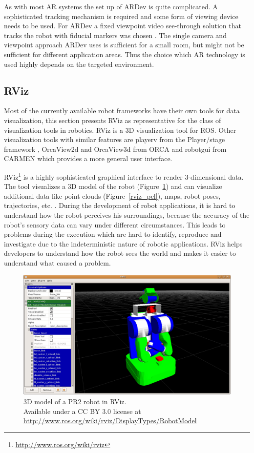 As with most AR systems the set up of ARDev is quite complicated. A sophisticated tracking mechanism is required and some form of viewing device needs to be used. For ARDev a fixed viewpoint video see-through solution that tracks the robot with fiducial markers was chosen \cite{Collett2010}. The single camera and viewpoint approach ARDev uses is sufficient for a small room, but might not be sufficient for different application areas. Thus the choice which AR technology is used highly depends on the targeted environment.

\subsection{RViz}
\label{rviz}
Most of the currently available robot frameworks have their own tools for data visualization, this section presents RViz as representative for the class of visualization tools in robotics. RViz is a 3D visualization tool for ROS. Other visualization tools with similar features are playerv from the Player/stage framework \cite{Gerkey2003}, OrcaView2d and OrcaView3d from ORCA \cite{Makarenko2006} and robotgui from CARMEN \cite{Montemerlo2003} which provides a more general user interface.

RViz\footnote{\url{http://www.ros.org/wiki/rviz}} is a highly sophisticated graphical interface to render 3-dimensional data. The tool visualizes a 3D model of the robot (Figure~\ref{rviz_model}) and can visualize additional data like point clouds (Figure~\ref{rviz_pcl}), maps, robot poses, trajectories, etc. \cite{Quigley2009}. During the development of robot applications, it is hard to understand how the robot perceives his surroundings, because the accuracy of the robot's sensory data can vary under different circumstances. This leads to problems during the execution which are hard to identify, reproduce and investigate due to the indeterministic nature of robotic applications. RViz helps developers to understand how the robot sees the world and makes it easier to understand what caused a problem.

\begin{figure}[htbp]
  \centering
  \includegraphics[scale=0.3]{img/RVizRobotModel.png}
  \caption{3D model of a PR2 robot in RViz.\\Available under a CC BY 3.0 license at \url{http://www.ros.org/wiki/rviz/DisplayTypes/RobotModel}}
  \label{rviz_model}
\end{figure}

